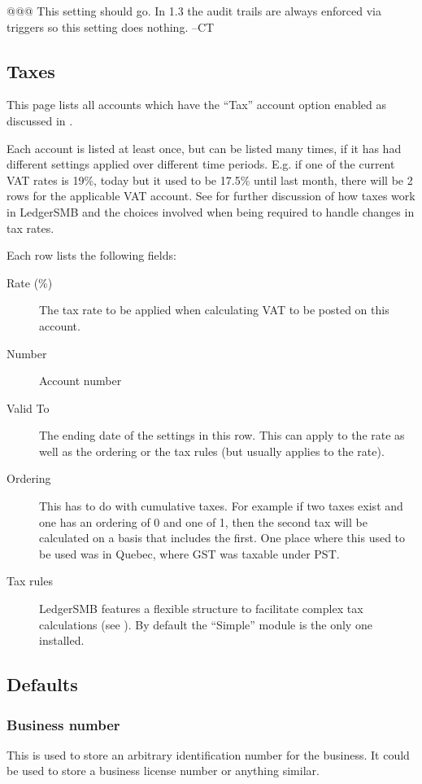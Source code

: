 @@@ This setting should go.  In 1.3 the audit trails are always enforced via
triggers so this setting does nothing.  --CT

\subsection{Taxes}

This page lists all accounts which have the ``Tax'' account option enabled as discussed in .

Each account is listed at least once, but can be listed many times, if it has had different
settings applied over different time periods. E.g. if one of the current VAT rates is 19\%,
today but it used to be 17.5\% until last month, there will be 2 rows for the applicable
VAT account. See  for further discussion of how taxes work in
LedgerSMB and the choices involved when being required to handle changes in tax rates.

Each row lists the following fields:

\begin{description}
\item [Rate (\%)] The tax rate to be applied when calculating VAT to be posted on this account.
\item [Number] Account number
\item [Valid To] The ending date of the settings in this row. This can apply to the rate as well as the ordering or the tax rules (but usually applies to the rate).
\item [Ordering] This has to do with cumulative taxes.  For example if two taxes
exist and one has an ordering of 0 and one of 1, then the second tax will be
calculated on a basis that includes the first.  One place where this used to be
used was in Quebec, where GST was taxable under PST.
\item [Tax rules] LedgerSMB features a flexible structure to facilitate complex tax
calculations (see ). By default the ``Simple'' module
is the only one installed.
\end{description}

\subsection{Defaults}
\label{subsec:Defaults}

\subsubsection{Business number}
   This is used to store an arbitrary identification number for the business.  It
could be used to store a business license number or anything similar.
   
